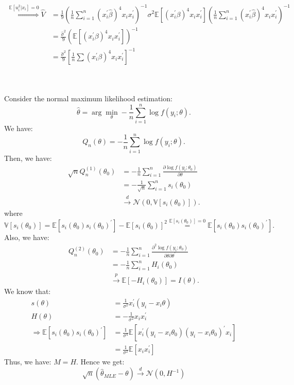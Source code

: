 \begin{eg}
\begin{align*}
        \overset{\mathbb{E}[u_i^2|x_i]=0}{\Longrightarrow} \hat{V} &= \frac{1}{9}\left(\frac{1}{n} \sum_{i=1}^{n} (x_i^{\prime} \hat{\beta})^4 x_i x_i^{\prime} \right)^{-1} \sigma^2\mathbb{E}\left[(x_i^{\prime} \beta)^4 x_i x_i^{\prime} \right] \left(\frac{1}{n} \sum_{i=1}^{n} (x_i^{\prime} \hat{\beta})^4 x_i x_i^{\prime} \right)^{-1} \\
        &= \frac{\hat{\sigma}^2}{9} \left(\mathbb{E}\left[(x_i^{\prime} \beta)^4 x_i x_i^{\prime} \right]\right)^{-1} \\
        &= \frac{\hat{\sigma}^2}{9} \left[\frac{1}{n} \sum (x_i^{\prime} \beta)^4 x_i x_i^{\prime} \right]^{-1} \\
    \end{align*}
\end{eg}

\begin{eg}
    \

    Consider the normal maximum likelihood estimation:
    \[
    \hat{\theta} = \arg \min_{\theta} -\frac{1}{n}\sum_{i=1}^{n} \log f(y_i; \theta).
    \]
    We have:
    \[
    Q_n(\theta) = -\frac{1}{n} \sum_{i=1}^{n} \log f(y_i; \theta).
    \]
    Then, we have:
    \begin{align*}
        \sqrt{n} Q_n^{(1)}(\theta_0) &= -\frac{1}{n} \sum_{i=1}^{n} \frac{\partial \log f(y_i; \theta_0)}{\partial \theta} \\
        &= -\frac{1}{\sqrt{n}} \sum_{i=1}^{n} s_i(\theta_0) \\ 
        &\overset{d}{\rightarrow} \mathcal{N}(0, \mathbb{V}[s_i(\theta_0)]).
    \end{align*}
    where
    \[
    \mathbb{V}[s_i(\theta_0)] = \mathbb{E}[s_i(\theta_0)s_i(\theta_0)^{\prime}] - \mathbb{E}[s_i(\theta_0)]^2 \stackrel{\mathbb{E}[s_i(\theta_0)] = 0}{=} \mathbb{E}[s_i(\theta_0)s_i(\theta_0)^{\prime}].
    \]
    Also, we have:
    \begin{align*}
        Q_n^{(2)}(\theta_0) &= -\frac{1}{n} \sum_{i=1}^{n} \frac{\partial^2 \log f(y_i; \theta_0)}{\partial \theta \partial \theta^{\prime}} \\
        &= -\frac{1}{n} \sum_{i=1}^{n} H_i(\theta_0) \\
        &\overset{p}{\rightarrow} \mathbb{E}[-H_i(\theta_0)] = I(\theta).
    \end{align*}
    We know that:
    \begin{align*}
        s(\theta) &= \frac{1}{\sigma ^2}x_i^{\prime} (y_i - x_i \theta) \\
        H(\theta) &= -\frac{1}{\sigma^2} x_i x_i^{\prime} \\
        \Rightarrow \mathbb{E}[s_i(\theta_0)s_i(\theta_0)^{\prime}] &= \frac{1}{\sigma^4} \mathbb{E}[x_i^{\prime} (y_i - x_i \theta_0)(y_i - x_i \theta_0)^{\prime} x_i] \\
        &= \frac{1}{\sigma^2} \mathbb{E}[x_i x_i^{\prime}]
    \end{align*}
    Thus, we have: $M = H$.
    Hence we get:
    \[\sqrt{n}(\hat{\theta}_{MLE} - \theta) \overset{d}{\rightarrow} \mathcal{N}(0, H^{-1})\]
\end{eg}